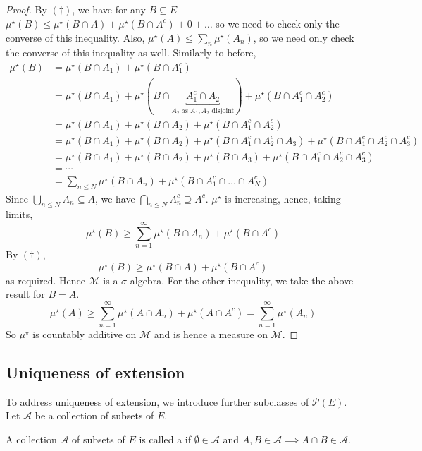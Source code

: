 \begin{proof}
	By $(\dagger)$, we have for any $B \subseteq E$ $\mu^\star(B) \leq \mu^\star(B \cap A) + \mu^\star(B \cap A^c) + 0 + \dots$ so we need to check only the converse of this inequality.
	Also, $\mu^\star(A) \leq \sum_n \mu^\star(A_n)$, so we need only check the converse of this inequality as well.
	Similarly to before,
	\begin{align*}
		\mu^\star(B) &= \mu^\star(B \cap A_1) + \mu^\star(B \cap A_1^c) \\
		&= \mu^\star(B \cap A_1) + \mu^\star(B \cap \underbracket{A_1^c \cap A_2}_{A_2 \text{ as $A_1, A_2$ disjoint}}) + \mu^\star(B \cap A_1^c \cap A_2^c) \\
		&= \mu^\star(B \cap A_1) + \mu^\star(B \cap A_2) + \mu^\star(B \cap A_1^c \cap A_2^c) \\
		&= \mu^\star(B \cap A_1) + \mu^\star(B \cap A_2) + \mu^\star(B \cap A_1^c \cap A_2^c \cap A_3) + \mu^\star(B \cap A_1^c \cap A_2^c \cap A_3^c) \\
		&= \mu^\star(B \cap A_1) + \mu^\star(B \cap A_2) + \mu^\star(B \cap A_3) + \mu^\star(B \cap A_1^c \cap A_2^c \cap A_3^c) \\
		&= \cdots \\
		&= \sum_{n \leq N} \mu^\star(B \cap A_n) + \mu^\star(B \cap A_1^c \cap \dots \cap A_N^c)
	\end{align*}
	Since $\bigcup_{n \leq N} A_n \subseteq A$, we have $\bigcap_{n \leq N} A_n^c \supseteq A^c$.
	$\mu^\star$ is increasing, hence, taking limits,
	\[ \mu^\star(B) \geq \sum_{n=1}^\infty \mu^\star(B \cap A_n) + \mu^\star(B \cap A^c) \]
	By $(\dagger)$,
	\[ \mu^\star(B) \geq \mu^\star(B \cap A) + \mu^\star(B \cap A^c) \]
	as required.
	Hence $\mathcal M$ is a $\sigma$-algebra.
	For the other inequality, we take the above result for $B = A$.
	\[ \mu^\star(A) \geq \sum_{n=1}^\infty \mu^\star(A \cap A_n) + \mu^\star(A \cap A^c) = \sum_{n=1}^\infty \mu^\star(A_n) \]
	So $\mu^\star$ is countably additive on $\mathcal M$ and is hence a measure on $\mathcal M$.
\end{proof}

\subsection{Uniqueness of extension}
To address uniqueness of extension, we introduce further subclasses of $\mathcal{P}(E)$. Let $\mathcal{A}$ be a collection of subsets of $E$.

\begin{definition}[$\pi$-system]
	A collection $\mathcal A$ of subsets of $E$ is called a  if $\emptyset \in \mathcal A$ and $A, B \in \mathcal A \implies A \cap B \in \mathcal A$.
\end{definition}


